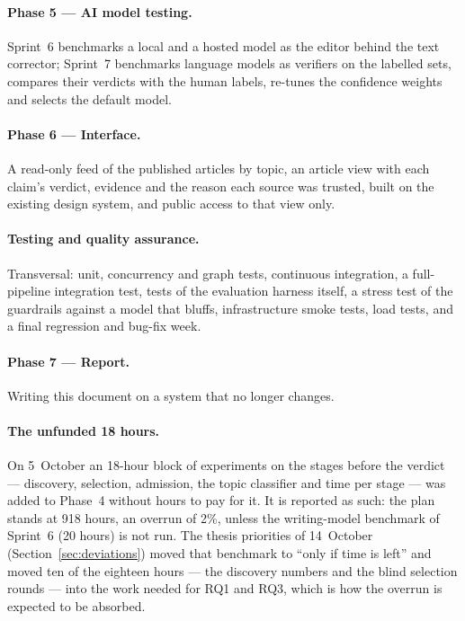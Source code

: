 \paragraph{Phase 5 --- AI model testing.} Sprint~6 benchmarks a local
and a hosted model as the editor behind the text corrector; Sprint~7
benchmarks language models as verifiers on the labelled sets, compares
their verdicts with the human labels, re-tunes the confidence weights
and selects the default model.

\paragraph{Phase 6 --- Interface.} A read-only feed of the published
articles by topic, an article view with each claim's verdict, evidence
and the reason each source was trusted, built on the existing design
system, and public access to that view only.

\paragraph{Testing and quality assurance.} Transversal: unit,
concurrency and graph tests, continuous integration, a full-pipeline
integration test, tests of the evaluation harness itself, a stress test
of the guardrails against a model that bluffs, infrastructure smoke
tests, load tests, and a final regression and bug-fix week.

\paragraph{Phase 7 --- Report.} Writing this document on a system that
no longer changes.

\paragraph{The unfunded 18 hours.} On 5~October an 18-hour block of
experiments on the stages before the verdict --- discovery, selection,
admission, the topic classifier and time per stage --- was added to
Phase~4 without hours to pay for it. It is reported as such: the plan
stands at 918 hours, an overrun of 2\%, unless the writing-model
benchmark of Sprint~6 (20 hours) is not run. The thesis priorities of
14~October (Section~\ref{sec:deviations}) moved that benchmark to
``only if time is left'' and moved ten of the eighteen hours --- the
discovery numbers and the blind selection rounds --- into the work
needed for RQ1 and RQ3, which is how the overrun is expected to be
absorbed.

